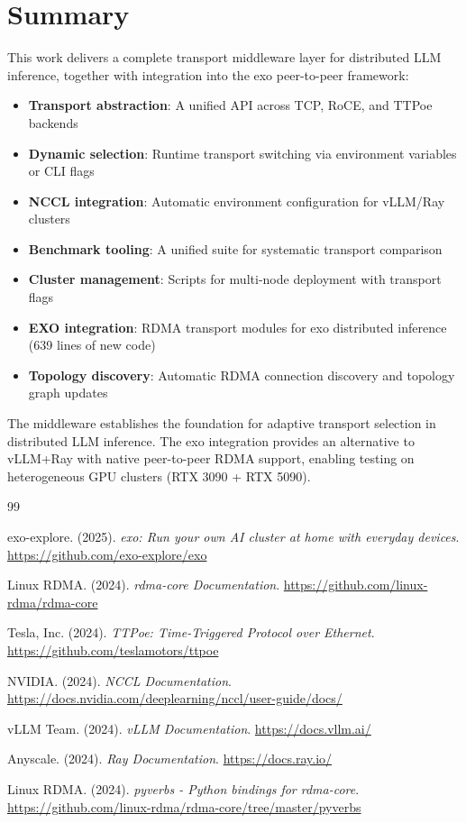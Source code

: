 \documentclass[10pt,letterpaper]{article}
\begin{document}
\section{Summary}

This work delivers a complete transport middleware layer for distributed LLM inference, together with integration into the exo peer-to-peer framework:

\begin{itemize}[noitemsep]
    \item \textbf{Transport abstraction}: A unified API across TCP, RoCE, and TTPoe backends
    \item \textbf{Dynamic selection}: Runtime transport switching via environment variables or CLI flags
    \item \textbf{NCCL integration}: Automatic environment configuration for vLLM/Ray clusters
    \item \textbf{Benchmark tooling}: A unified suite for systematic transport comparison
    \item \textbf{Cluster management}: Scripts for multi-node deployment with transport flags
    \item \textbf{EXO integration}: RDMA transport modules for exo distributed inference (639 lines of new code)
    \item \textbf{Topology discovery}: Automatic RDMA connection discovery and topology graph updates
\end{itemize}

The middleware establishes the foundation for adaptive transport selection in distributed LLM inference. The exo integration provides an alternative to vLLM+Ray with native peer-to-peer RDMA support, enabling testing on heterogeneous GPU clusters (RTX 3090 + RTX 5090).

\begin{thebibliography}{99}

exo-explore. (2025). \textit{exo: Run your own AI cluster at home with everyday devices}. \url{https://github.com/exo-explore/exo}

Linux RDMA. (2024). \textit{rdma-core Documentation}. \url{https://github.com/linux-rdma/rdma-core}

Tesla, Inc. (2024). \textit{TTPoe: Time-Triggered Protocol over Ethernet}. \url{https://github.com/teslamotors/ttpoe}

NVIDIA. (2024). \textit{NCCL Documentation}. \url{https://docs.nvidia.com/deeplearning/nccl/user-guide/docs/}

vLLM Team. (2024). \textit{vLLM Documentation}. \url{https://docs.vllm.ai/}

Anyscale. (2024). \textit{Ray Documentation}. \url{https://docs.ray.io/}

Linux RDMA. (2024). \textit{pyverbs - Python bindings for rdma-core}. \url{https://github.com/linux-rdma/rdma-core/tree/master/pyverbs}

\end{thebibliography}
\end{document}
